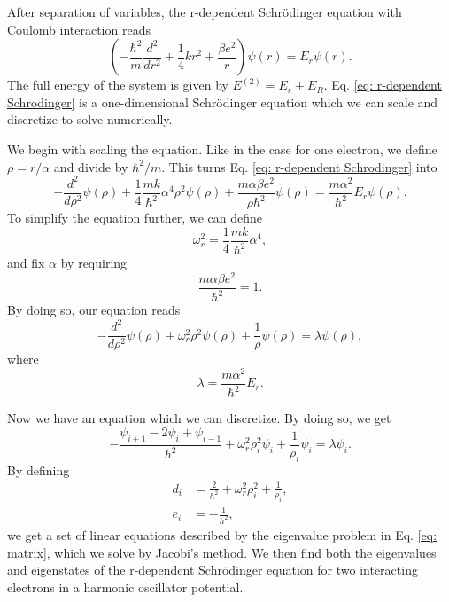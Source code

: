 \documentclass[%
 reprint,
nofootinbib,
aps,
]{revtex4-1}
\begin{document}
After separation of variables, the r-dependent Schrödinger equation with Coulomb interaction reads
\begin{equation}\label{eq: r-dependent Schrodinger}
\left(  -\frac{\hbar^2}{m} \frac{d^2}{dr^2}+ \frac{1}{4}k r^2+\frac{\beta e^2}{r}\right)\psi(r)  = E_r \psi(r).
\end{equation}
The full energy of the system is given by $E^{(2)} = E_r + E_R$. Eq. \eqref{eq: r-dependent Schrodinger} is a one-dimensional Schrödinger equation which we can scale and discretize to solve numerically.

We begin with scaling the equation. Like in the case for one electron, we define $\rho = r/\alpha$ and divide by $\hbar^2/m$. This turns Eq. \eqref{eq: r-dependent Schrodinger} into
\begin{equation}
  -\frac{d^2}{d\rho^2} \psi(\rho)
       + \frac{1}{4}\frac{mk}{\hbar^2} \alpha^4\rho^2\psi(\rho)+\frac{m\alpha \beta e^2}{\rho\hbar^2}\psi(\rho)  =
\frac{m\alpha^2}{\hbar^2}E_r \psi(\rho) .
\end{equation}
To simplify the equation further, we can define
\begin{equation}
\omega_r^2=\frac{1}{4}\frac{mk}{\hbar^2} \alpha^4,
\end{equation}
and fix $\alpha$ by requiring
\begin{equation}
\frac{m\alpha \beta e^2}{\hbar^2}=1.
\end{equation}
By doing so, our equation reads
\begin{equation}
  -\frac{d^2}{d\rho^2} \psi(\rho) + \omega_r^2\rho^2\psi(\rho) +\frac{1}{\rho}\psi(\rho) = \lambda \psi(\rho),
\end{equation}
where
\begin{equation}
\lambda = \frac{m\alpha^2}{\hbar^2}E_r.
\end{equation}

Now we have an equation which we can discretize. By doing so, we get
\begin{equation}\label{eq: two electrons discretized}
 -\frac{\psi_{i+1} -2\psi_i +\psi_{i-1}}{h^2} + \omega_r^2\rho_i^2\psi_i +\frac{1}{\rho_i}\psi_i = \lambda \psi_i.
\end{equation}
By defining
\begin{align}
d_i &= \frac{2}{h^2} + \omega_r^2\rho_i^2 + \frac{1}{\rho_i},\\
e_i &= -\frac{1}{h^2},
\end{align}
we get a set of linear equations described by the eigenvalue problem in Eq. \eqref{eq: matrix}, which we solve by Jacobi's method. We then find both the eigenvalues and eigenstates of the r-dependent Schrödinger equation for two interacting electrons in a harmonic oscillator potential.
\end{document}
